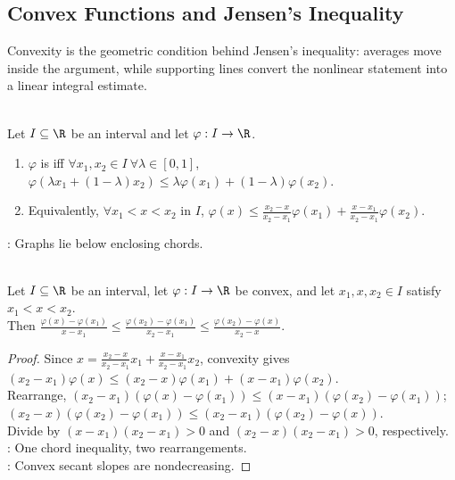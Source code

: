 \subsection{Convex Functions and Jensen's Inequality}

Convexity is the geometric condition behind Jensen's inequality: averages move inside the argument, while supporting lines convert the nonlinear statement into a linear integral estimate.

\begin{definition} \label{def:convex-function-on-interval} \\
Let $I\subseteq\R$ be an interval and let $\varphi:I\to\R$.
\begin{enumerate}[label=(\roman*)]
\setlength{\itemsep}{0pt}
\item $\varphi$ is  iff $\forall x_1,x_2\in I\ \forall\lambda\in[0,1]$, $\varphi(\lambda x_1+(1-\lambda)x_2)\leq\lambda\varphi(x_1)+(1-\lambda)\varphi(x_2)$.
\item Equivalently, $\forall x_1<x<x_2$ in $I$, $\varphi(x)\leq\frac{x_2-x}{x_2-x_1}\varphi(x_1)+\frac{x-x_1}{x_2-x_1}\varphi(x_2)$.
\end{enumerate}
: Graphs lie below enclosing chords.
\end{definition}

\begin{lemma} \label{lem:convex-chordal-slope-lemma} \\
Let $I\subseteq\R$ be an interval, let $\varphi:I\to\R$ be convex, and let $x_1,x,x_2\in I$ satisfy $x_1<x<x_2$.\\
Then $\frac{\varphi(x)-\varphi(x_1)}{x-x_1}\leq\frac{\varphi(x_2)-\varphi(x_1)}{x_2-x_1}\leq\frac{\varphi(x_2)-\varphi(x)}{x_2-x}$.
\begin{proof} Since $x=\frac{x_2-x}{x_2-x_1}x_1+\frac{x-x_1}{x_2-x_1}x_2$, convexity gives $(x_2-x_1)\varphi(x)\leq(x_2-x)\varphi(x_1)+(x-x_1)\varphi(x_2)$.\\
Rearrange, $(x_2-x_1)(\varphi(x)-\varphi(x_1))\leq(x-x_1)(\varphi(x_2)-\varphi(x_1))$; $(x_2-x)(\varphi(x_2)-\varphi(x_1))\leq(x_2-x_1)(\varphi(x_2)-\varphi(x))$.\\
Divide by $(x-x_1)(x_2-x_1)>0$ and $(x_2-x)(x_2-x_1)>0$, respectively.\\
: One chord inequality, two rearrangements.\\
: Convex secant slopes are nondecreasing.
\end{proof}
\end{lemma}

